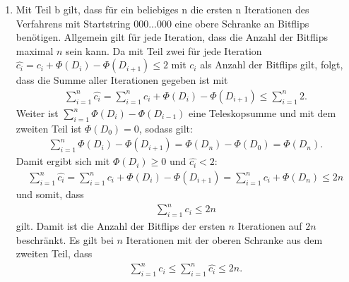 \documentclass{scrartcl} %
\begin{document}
\begin{aufgabe}
\begin{enumerate}[label=(\alph*)]
            \begin{align*}
                \Phi(D_i) = \Phi(D_{i-1}) + o - m.
            \end{align*}
            Damit ergibt sich für 
            \begin{align*}
                \Phi(D_i) - \Phi(D_{i-1}) = \Phi(D_{i-1}) + o - m - \Phi(D_{i-1}) = o - m.
            \end{align*} Dann folgt für $\hat{c_i}$, dass 
            \begin{align*}
                \hat{c_i}=n +o - m=  o + m + o - m = 2 o \leq 2.
            \end{align*} Dies gilt, da im Maximalfall, wenn alle $1$ auf $0$ flippen, nach Teilaufgabe eins maximal ein Bit auf $1$ flippt, womit $o \leq 1$ gilt und die Voraussetzung erfüllt ist. 
            \item Mit Teil b gilt, dass für ein beliebiges n die ersten n Iterationen des Verfahrens mit Startstring $000...000$ eine obere Schranke an Bitflips benötigen. Allgemein gilt für jede Iteration, dass die Anzahl der Bitflips maximal $n$ sein kann. Da mit Teil zwei für jede Iteration $\hat{c_i}= c_i + \Phi(D_i) - \Phi(D_{i+1}) \leq 2$ mit $c_i$ als Anzahl der Bitflips gilt, folgt, dass die Summe aller Iterationen gegeben ist mit 
            \begin{align*}
                \sum_{i=1}^n \hat{c_i} = \sum_{i=1}^n c_i + \Phi(D_i) - \Phi(D_{i+1}) \leq \sum_{i=1}^n 2.
            \end{align*}
            Weiter ist $\sum_{i=1}^n \Phi(D_i) - \Phi(D_{i-1})$ eine Teleskopsumme und mit dem zweiten Teil ist $\Phi(D_0)=0$, sodass gilt:
            \begin{align*}
                \sum_{i=1}^n \Phi(D_i) - \Phi(D_{i+1}) = \Phi(D_n) - \Phi(D_0) = \Phi (D_n).
            \end{align*} Damit ergibt sich mit $\Phi(D_i)\geq 0$ und $\hat{c_i}< 2$:
            \begin{align*}
                \sum_{i=1}^n \hat{c_i} = \sum_{i=1}^n c_i + \Phi(D_i) - \Phi(D_{i+1}) = \sum_{i=1}^n c_i + \Phi(D_n) \leq 2n
            \end{align*} und somit, dass 
            \begin{align*}
                \sum_{i=1}^n c_i \leq 2n
            \end{align*} gilt. Damit ist die Anzahl der Bitflips der ersten $n$ Iterationen auf $2n$ beschränkt. Es gilt bei $n$ Iterationen mit der oberen Schranke aus dem zweiten Teil, dass 
            \begin{align*}
                \sum_{i=1}^n c_i \leq \sum_{i=1}^n \hat{c_i} \leq 2n. 
            \end{align*}
        \end{enumerate}
    \end{aufgabe}
\end{document}
